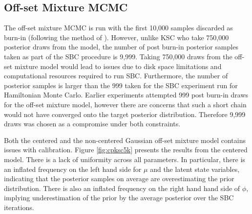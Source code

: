 \documentclass[12pt, a4paper]{article}
\begin{document}
    
    \subsection{Off-set Mixture MCMC}
    The off-set mixture MCMC is run with the first 10,000 samples discarded as burn-in (following the method of \citet{kim1998stochastic}). However, unlike KSC who take 750,000 posterior draws from the model, the number of post burn-in posterior samples taken as part of the SBC procedure is 9,999. Taking 750,000 draws from the off-set mixture model would lead to issues due to disk space limitations and computational resources required to run SBC. Furthermore, the number of posterior samples is larger than the 999 taken for the SBC experiment run for Hamiltonian Monte Carlo. Earlier experiments attempted 999 post burn-in draws for the off-set mixture model, however there are concerns that such a short chain would not have converged onto the target posterior distribution. Therefore 9,999 draws was chosen as a compromise under both constraints. 

    Both the centered and the non-centered Gaussian off-set mixture model contains issues with calibration. Figure \ref{fig:cpksc5k} presents the results from the centered model. There is a lack of uniformity across all parameters. In particular, there is an inflated frequency on the left hand side for $\mu$ and the latent state variables, indicating that the posterior samples on average are overestimating the prior distribution. There is also an inflated frequency on the right hand hand side of $\phi$, implying underestimation of the prior by the average posterior over the SBC iterations. 
\end{document}
